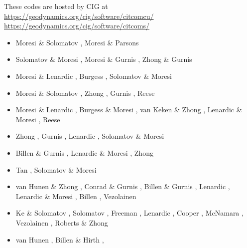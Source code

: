 \begin{itemize}
These codes are hosted by CIG at\\
\url{https://geodynamics.org/cig/software/citcomcu/}  \\
\url{https://geodynamics.org/cig/software/citcoms/}

\begin{scriptsize}
\begin{itemize}
\item[\nineteenninetyfive] Moresi \& Solomatov \cite{moso95}, Moresi \& Parsons \cite{mopa95}
\item[\nineteenninetysix] Solomatov \& Moresi \cite{somo96}, Moresi \& Gurnis \cite{mogu96}, 
                    Zhong \& Gurnis \cite{zhgu96}
\item[\nineteenninetyseven] Moresi \& Lenardic \cite{mole97}, Burgess \etal \cite{bugm97}, 
                    Solomatov \& Moresi \cite{somo97}
\item[\nineteenninetyeight] Moresi \& Solomatov \cite{moso98}, Zhong \etal \cite{zhgm98}, 
                    Gurnis \etal \cite{gumm98}, Reese \etal \cite{resm98}
\item[\nineteenninetynine] Moresi \& Lenardic \cite{mole99}, Burgess \& Moresi \cite{bumo99}, 
                    van Keken \& Zhong \cite{vazh99}, Lenardic \& Moresi \cite{lemo99}, 
                    Reese \etal \cite{resm99}
\item[\twothousand] Zhong \etal \cite{zhzm00}, Gurnis \etal \cite{gumr00,gumm00},
                    Lenardic \etal \cite{lemm00}, Solomatov \& Moresi \cite{somo00}
\item[\twothousandone] Billen \& Gurnis \cite{bigu01}, Lenardic \& Moresi \cite{lemo01},
                    Zhong \cite{zhon01}
\item[\twothousandtwo] Tan \etal \cite{tagh02}, Solomatov \& Moresi \cite{somo02}
\item[\twothousandthree] van Hunen \& Zhong \cite{vazh03}, Conrad \& Gurnis \cite{cogu03},
                    Billen \& Gurnis \cite{bigu03}, Lenardic \etal \cite{lemm03},
                    Lenardic \& Moresi \cite{lemo03}, Billen \etal \cite{bigs03}, 
                    Vezolainen \etal \cite{vesh03}
\item[\twothousandfour] Ke \& Solomatov \cite{keso04}, Solomatov \cite{solo04},
                    Freeman \etal \cite{frmm04}, Lenardic \etal \cite{lenm04},
                    Cooper \etal \cite{colm04}, McNamara \etal \cite{mczh04}, 
                    Vezolainen \etal \cite{vesb04}, Roberts \& Zhong \cite{rozh04}
\item[\twothousandfive] van Hunen \etal \cite{vazs05}, Billen \& Hirth \cite{bihi05},

\end{itemize}
\end{scriptsize}
\end{itemize}
